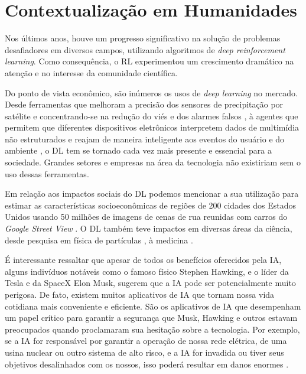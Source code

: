 \chapter{Contextualização em Humanidades}
\label{chap:ctx-hum}


Nos últimos anos, houve um progresso significativo na solução de problemas desafiadores em diversos campos, utilizando algoritmos de \textit{deep reinforcement learning}. Como consequência, o RL experimentou um crescimento dramático na atenção e no interesse da comunidade científica. 



Do ponto de vista econômico, são inúmeros os usos de \textit{deep learning} no mercado. Desde ferramentas que melhoram a precisão dos sensores de precipitação por satélite e concentrando-se na redução do viés e dos alarmes falsos \cite{doi:10.1175/JHM-D-15-0075.1}, à agentes que permitem que diferentes dispositivos eletrônicos interpretem dados de multimídia não estruturados e reajam de maneira inteligente aos eventos do usuário e do ambiente \cite{dl-IoT}, o DL tem se tornado cada vez mais presente e essencial para a sociedade. Grandes setores e empresas na área da tecnologia não existiriam sem o uso dessas ferramentas.

Em relação aos impactos sociais do DL podemos mencionar a sua utilização para estimar as características socioeconômicas de regiões de 200 cidades dos Estados Unidos usando 50 milhões de imagens de cenas de rua reunidas com carros do \textit{Google Street View} \cite{Gebru13108}. O DL também teve impactos em diversas áreas da ciência, desde pesquisa em física de partículas \cite{baldi:s:w:2015}, à medicina \cite{nassif:speech-rec:2019}.

É interessante ressaltar que apesar de todos os benefícios oferecidos pela IA, alguns indivíduos notáveis como o famoso físico Stephen Hawking, e o líder da Tesla e da SpaceX Elon Musk, sugerem que a IA pode ser potencialmente muito perigosa. De fato, existem muitos aplicativos de IA que tornam nossa vida cotidiana mais conveniente e eficiente. São os aplicativos de IA que desempenham um papel crítico para garantir a segurança que Musk, Hawking e outros estavam preocupados quando proclamaram sua hesitação sobre a tecnologia. Por exemplo, se a IA for responsável por garantir a operação de nossa rede elétrica, de uma usina nuclear ou outro sistema de alto risco, e a IA for invadida ou tiver seus objetivos desalinhados com os nossos, isso poderá resultar em danos enormes \cite{Marr:AI-Danger}. 

